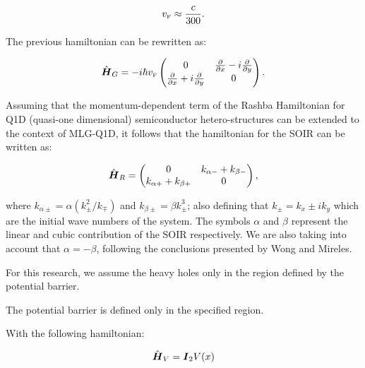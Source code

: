     \begin{equation}
        \label{eq:vF}
        v_{\mbox{\tiny F}} \approx \frac{c}{300}.
    \end{equation}

    The previous hamiltonian can be rewritten as:

\begin{equation}
    \label{eq:pristineGrapheneMatrix}
    \hat{\mbox{\boldmath $H$}}_G = -i\hbar v_{\mbox{\tiny F}}
    \begin{pmatrix}
        0 & \frac{\partial}{\partial x}- i\frac{\partial}{\partial y}\\
        \frac{\partial}{\partial x}+ i\frac{\partial}{\partial y} & 0
    \end{pmatrix}.
\end{equation}

    Assuming that the momentum-dependent term of the Rashba Hamiltonian for Q1D (quasi-one dimensional) semiconductor hetero-structures can be extended to the context of MLG-Q1D\cite{RDiago2010, Serna2019}, it follows that the hamiltonian for the SOIR can be written as:

    \begin{equation}
        \label{eq:SOIRHamiltonian}
        \hat{\mbox{\boldmath $H$}}_R =
        \begin{pmatrix}
            0 & k_{\alpha-} + k_{\beta-}\\
            k_{\alpha+} + k_{\beta+} & 0
        \end{pmatrix},
    \end{equation}

    \noindent where $k_{\alpha\pm} = \alpha\left(k_{\pm}^2/k_{\mp}\right)$ and $k_{\beta\pm} = \beta k_{\pm}^3$; also defining that $k_{\pm}=k_x\pm i k_y$ which are the initial wave numbers of the system.
    The symbols $\alpha$ and $\beta$ represent the linear and cubic contribution of the SOIR respectively.
    We are also taking into account that $\alpha = -\beta$, following the conclusions presented by Wong and Mireles\cite{WongUNAM2005}.

    For this research, we assume the heavy holes only in the region defined by the potential barrier.

    The potential barrier is defined only in the specified region.


    With the following hamiltonian:

    \begin{equation}
        \label{eq:potentialBarrierHamiltonian}
        \hat{\mbox{\boldmath $H$}}_V=\mbox{\boldmath $I$}_2 V(x)
    \end{equation}


